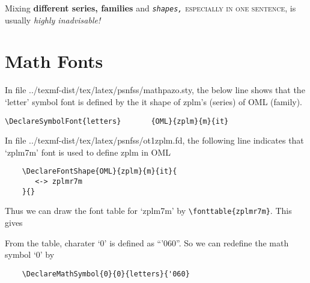 \documentclass[10pt,a4paper,extrafontsizes,oldfontcommands,oneside]{memoir}
\begin{document}
Mixing \textbf{different series, \textsf{families}} and \textsl{\texttt{shapes,}} \textsc{especially in one sentence,} is usually \emph{highly inadvisable!}

\clearpage
\section{Math Fonts}

In file ../texmf-dist/tex/latex/psnfss/mathpazo.sty, the below line shows that the `letter' symbol font is defined by the it shape of zplm's (series) of OML (family).
\begin{verbatim}
\DeclareSymbolFont{letters}       {OML}{zplm}{m}{it}
\end{verbatim}

In file ../texmf-dist/tex/latex/psnfss/ot1zplm.fd, the following line indicates that `zplm7m' font is used to define zplm in OML
\begin{verbatim}
	\DeclareFontShape{OML}{zplm}{m}{it}{
	   <-> zplmr7m
	}{}
\end{verbatim}

Thus we can draw the font table for `zplm7m' by \verb+\fonttable{zplmr7m}+. This gives

From the table, charater `0' is defined as ``'060''. So we can redefine the math symbol `0' by
\begin{verbatim}
	\DeclareMathSymbol{0}{0}{letters}{'060}
\end{verbatim}

\clearpage
\end{document}
